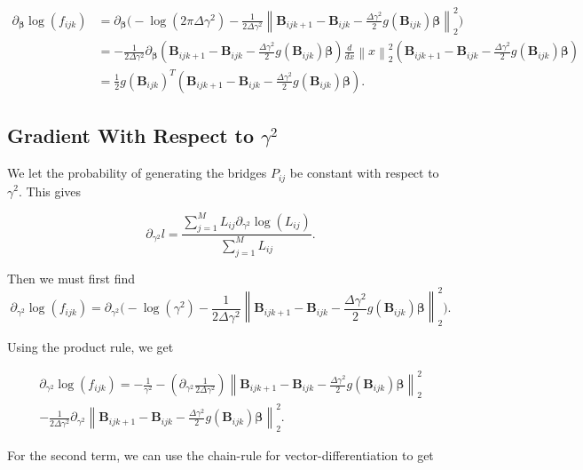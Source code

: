 \begin{equation} 
\begin{split}
\partial_{\bm \beta} \log(f_{ijk}) & = \partial_{\bm \beta} \bigg(-\log(2\pi \Delta \gamma^2) - \frac{1}{2\Delta \gamma^2} \left\lVert \textbf{B}_{ijk+1} - \textbf{B}_{ijk} - \frac{\Delta\gamma^2}{2} g(\textbf{B}_{ijk})\bm \beta \right\rVert_2^2 \bigg) \\
& = -\frac{1}{2\Delta\gamma^2}\partial_{\bm \beta} (\textbf{B}_{ijk+1} - \textbf{B}_{ijk} - \frac{\Delta\gamma^2}{2} g(\textbf{B}_{ijk})\bm \beta) \frac{d}{dx} \left\lVert x \right\rVert_2^2(\textbf{B}_{ijk+1} - \textbf{B}_{ijk} - \frac{\Delta\gamma^2}{2} g(\textbf{B}_{ijk})\bm \beta) \\
& = \frac{1}{2} g(\textbf{B}_{ijk})^T(\textbf{B}_{ijk+1} - \textbf{B}_{ijk} - \frac{\Delta\gamma^2}{2} g(\textbf{B}_{ijk})\bm \beta).
\end{split}
\end{equation}




\subsection*{Gradient With Respect to $\gamma^2$}
We let the probability of generating the bridges $P_{ij}$ be constant with respect to $\gamma^2$. This gives

$$
\partial_{\gamma^2}l = \frac{\sum_{j=1}^ML_{ij}\partial_{\gamma^2} \log(L_{ij})}{\sum_{j=1}^ML_{ij}}.
$$

Then we must first find
$$
\partial_{\gamma^2} \log(f_{ijk}) = \partial_{\gamma^2} \bigg(-\log(\gamma^2) - \frac{1}{2\Delta\gamma^2}\left\lVert \textbf{B}_{ijk+1} - \textbf{B}_{ijk} - \frac{\Delta\gamma^2}{2} g(\textbf{B}_{ijk})\bm \beta \right\rVert_2^2\bigg).
$$

Using the product rule, we get

\begin{align*}
\partial_{\gamma^2} \log(f_{ijk})  = -\frac{1}{\gamma^2} -(\partial_{\gamma^2} \frac{1}{2\Delta \gamma^2})\left\lVert \textbf{B}_{ijk+1} - \textbf{B}_{ijk} - \frac{\Delta\gamma^2}{2} g(\textbf{B}_{ijk})\bm \beta \right\rVert_2^2 \\ -  \frac{1}{2\Delta \gamma^2} \partial_{\gamma^2} \left\lVert \textbf{B}_{ijk+1} - \textbf{B}_{ijk} - \frac{\Delta\gamma^2}{2} g(\textbf{B}_{ijk})\bm \beta \right\rVert_2^2.
\end{align*}

For the second term, we can use the chain-rule for vector-differentiation to get

